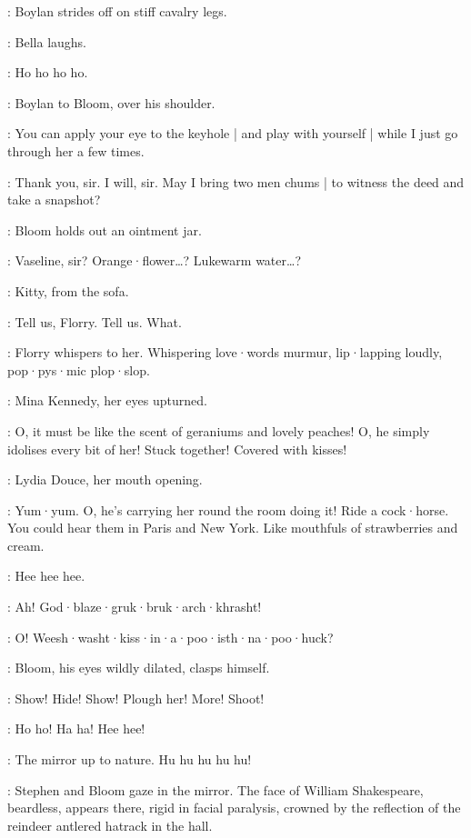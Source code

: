 :
Boylan strides off on stiff cavalry legs.

:
Bella laughs.

\Bella:
Ho ho ho ho.

:
Boylan to Bloom,
over his shoulder.

\Boylan:
You can apply your eye to the keyhole |
and play with yourself |
while I just go through her a few times.

\Bloom:
Thank you,
sir.
I will,
sir.
May I bring two men chums |
to witness the deed and take a snapshot?

:
Bloom holds out an ointment jar.

\Bloom:
Vaseline,
sir?
Orange·flower…?
Lukewarm water…?

:
Kitty,
from the sofa.

\Kitty:
Tell us,
Florry.
Tell us.
What.

:
Florry whispers to her.
Whispering love·words murmur,
lip·lapping loudly,
pop·pys·mic plop·slop.

:
Mina Kennedy,
her eyes upturned.

\MinaKennedy:
O,
it must be like the scent of geraniums and lovely peaches!
%
O,
he simply idolises every bit of her!
Stuck together!
Covered with kisses!

:
Lydia Douce,
her mouth opening.

\LydiaDouce:
Yum·yum.
O,
he's carrying her round the room doing it!
Ride a cock·horse.
You could hear them in Paris and New York.
Like mouthfuls of strawberries and cream.

\Kitty:
Hee hee hee.

\BoylansVoice:
Ah!
God·blaze·gruk·bruk·arch·khrasht!%

\MarionsVoice:
O!
Weesh·washt·kiss·in·a·poo·isth·na·poo·huck?

:
Bloom,
his eyes wildly dilated,
clasps himself.

\Bloom:
Show!
Hide!
Show!
Plough her!
More!
Shoot!

\BellaZoeFlorryKitty:
Ho ho!
Ha ha!
Hee hee!

\Lynch:
The mirror up to nature.
%
Hu hu hu hu hu!

:
Stephen and Bloom gaze in the mirror.
The face of William Shakespeare,
beardless,
appears there,
rigid in facial paralysis,
crowned by the reflection of the reindeer antlered hatrack in the hall.

